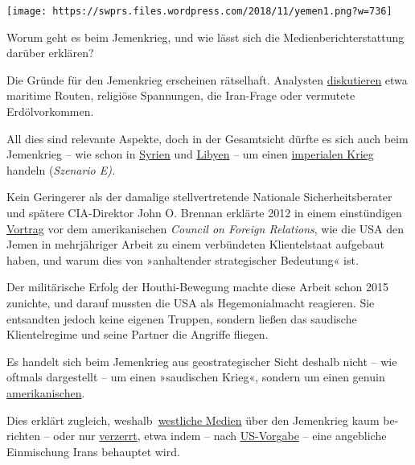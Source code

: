 \texttt{[image: https://swprs.files.wordpress.com/2018/11/yemen1.png?w=736]}

Worum geht es beim Jemenkrieg, und wie lässt sich die
Medienberichterstattung darüber erklären?

Die Gründe für den Jemenkrieg erscheinen rätselhaft. Analysten
\href{https://www.heise.de/tp/features/Jemens-Reichtum-als-Kriegsgrund-Zweiter-Versuch-4218943.html}{diskutieren}
etwa maritime Routen, religiöse Spannungen, die Iran-Frage oder
vermutete Erdölvorkommen.

All dies sind relevante Aspekte, doch in der Gesamtsicht dürfte es sich
auch beim Jemenkrieg -- wie schon in
\href{https://web.archive.org/web/20190721115142/https://washingtonsblog.com/2018/04/syrian-regime-change-a-70-year-project.html}{Syrien}
und \href{https://globalresearch.ca/libya-a-war-on-africa/26474}{Libyen}
-- um einen \href{https://swprs.org/logik-imperialer-kriege/}{imperialen
Krieg} handeln (\emph{Szenario E).}

Kein Geringerer als der damalige stellvertretende Nationale
Sicherheitsberater und spätere CIA-Direktor John O. Brennan erklärte
2012 in einem einstündigen
\href{https://www.youtube.com/watch?v=0cUlPv-xBvI}{Vortrag} vor dem
amerikanischen \emph{Council on Foreign Relations}, wie die USA den
Jemen in mehrjähriger Arbeit zu einem verbündeten Klientelstaat
aufgebaut haben, und warum dies von »anhaltender strategischer
Bedeutung« ist.

Der militärische Erfolg der Houthi-Bewegung machte diese Arbeit schon
2015 zunichte, und darauf mussten die USA als Hegemonialmacht reagieren.
Sie entsandten jedoch keine eigenen Truppen, sondern ließen das
saudische Klientelregime und seine Partner die Angriffe fliegen.

Es handelt sich beim Jemenkrieg aus geostrategischer Sicht deshalb nicht
-- wie oftmals dargestellt -- um einen »saudischen Krieg«, sondern um
einen genuin
\href{https://www.mintpressnews.com/wp-content/uploads/2017/01/US-double-standards-on-Syria-and-Yemen-MintPress-News.jpg}{amerikanischen}.

Dies erklärt zugleich,
weshalb~\href{https://swprs.org/netzwerk-medien-deutschland/}{westliche
Medien} über den Jemenkrieg kaum be­rich­ten -- oder nur
\href{https://www.strategic-culture.org/news/2018/06/18/western-media-whitewash-yemen-genocide.html}{verzerrt},
etwa indem -- nach
\href{https://www.bbc.co.uk/news/world-middle-east-42356969}{US-Vorgabe}
-- eine angebliche Einmischung Irans behauptet wird.


